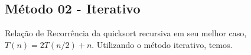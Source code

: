 \subsection{Método 02 - Iterativo}
Relação de Recorrência da quicksort recursiva em seu melhor caso, $T(n) = 2T(n/2) + n$. Utilizando o método iterativo, temos.
